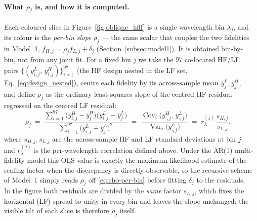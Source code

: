 \documentclass[11pt,a4paper]{article}
\newcommand{\nHF}{97}          %
\begin{document}
\paragraph{What $\rho_j$ is, and how it is computed.}
Each coloured slice in Figure~\ref{fig:oblique_hflf} is a single wavelength bin
$\lambda_j$, and its colour is the \emph{per-bin slope} $\rho_j$ --- the same
scalar that couples the two fidelities in Model~1,
$f_{H,j}=\rho_j f_{L,j}+\delta_j$ (Section~\ref{subsec:model1}). It is obtained
bin-by-bin, not from any joint fit. For a fixed bin $j$ we take the $\nHF{}$
co-located HF/LF pairs $\{(y^{L}_{i,j},\,y^{H}_{i,j})\}_{i=1}^{\nHF}$ (the HF
design nested in the LF set, Eq.~\ref{eq:design_nested}), centre each fidelity by
its across-sample mean $\bar y^{L}_{j},\bar y^{H}_{j}$, and define $\rho_j$ as the
ordinary least-squares slope of the centred HF residual regressed on the centred
LF residual:
\begin{equation}
  \rho_j
  \;=\;
  \frac{\sum_{i=1}^{\nHF}\bigl(y^{H}_{i,j}-\bar y^{H}_{j}\bigr)
        \bigl(y^{L}_{i,j}-\bar y^{L}_{j}\bigr)}
       {\sum_{i=1}^{\nHF}\bigl(y^{L}_{i,j}-\bar y^{L}_{j}\bigr)^{2}}
  \;=\;
  \frac{\operatorname{Cov}_i\!\bigl(y^{H}_{\cdot,j},\,y^{L}_{\cdot,j}\bigr)}
       {\operatorname{Var}_i\!\bigl(y^{L}_{\cdot,j}\bigr)}
  \;=\;
  r_{\lambda}^{(j)}\,\frac{s_{H,j}}{s_{L,j}},
  \label{eq:rho-per-bin}
\end{equation}
where $s_{H,j},s_{L,j}$ are the across-sample HF and LF standard deviations at
bin $j$ and $r_{\lambda}^{(j)}$ is the per-wavelength correlation defined above.
Under the AR(1) multi-fidelity model this OLS value is exactly the
maximum-likelihood estimate of the scaling factor when the discrepancy is
directly observable, so the recursive scheme of Model~1 simply reads $\rho_j$ off
\eqref{eq:rho-per-bin} before fitting $\delta_j$ to the residuals. In the figure
both residuals are divided by the \emph{same} factor $s_{L,j}$, which fixes the
horizontal (LF) spread to unity in every bin and leaves the slope unchanged; the
visible tilt of each slice is therefore $\rho_j$ itself.
\end{document}
